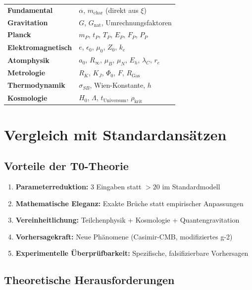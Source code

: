 	\begin{center}
		\begin{tabular}{ll}
			\textbf{Fundamental} & $\alpha$, $m_{\text{char}}$ (direkt aus $\xi$) \\
			\textbf{Gravitation} & $G$, $G_{\text{nat}}$, Umrechnungsfaktoren \\
			\textbf{Planck} & $m_P$, $t_P$, $T_P$, $E_P$, $F_P$, $P_P$ \\
			\textbf{Elektromagnetisch} & $e$, $\epsilon_0$, $\mu_0$, $Z_0$, $k_e$ \\
			\textbf{Atomphysik} & $a_0$, $R_\infty$, $\mu_B$, $\mu_N$, $E_h$, $\lambda_C$, $r_e$ \\
			\textbf{Metrologie} & $R_K$, $K_J$, $\Phi_0$, $F$, $R_{\text{Gas}}$ \\
			\textbf{Thermodynamik} & $\sigma_{SB}$, Wien-Konstante, $h$ \\
			\textbf{Kosmologie} & $H_0$, $\Lambda$, $t_{\text{Universum}}$, $\rho_{\text{krit}}$ \\
		\end{tabular}
	\end{center}
	
	\section{Vergleich mit Standardansätzen}
	
	\subsection{Vorteile der T0-Theorie}
	
	\begin{enumerate}
		\item \textbf{Parameterreduktion:} 3 Eingaben statt $>20$ im Standardmodell
		\item \textbf{Mathematische Eleganz:} Exakte Brüche statt empirischer Anpassungen
		\item \textbf{Vereinheitlichung:} Teilchenphysik + Kosmologie + Quantengravitation
		\item \textbf{Vorhersagekraft:} Neue Phänomene (Casimir-CMB, modifiziertes g-2)
		\item \textbf{Experimentelle Überprüfbarkeit:} Spezifische, falsifizierbare Vorhersagen
	\end{enumerate}
	
	\subsection{Theoretische Herausforderungen}
	
